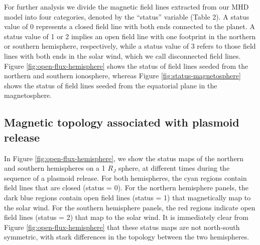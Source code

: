 For further analysis we divide the magnetic field lines extracted from our MHD model into four categories, denoted by the “status” variable (Table 2). A status value of 0 represents a closed field line with both ends connected to the planet. A status value of 1 or 2 implies an open field line with one footprint in the northern or southern hemisphere, respectively, while a status value of 3 refers to those field lines with both ends in the solar wind, which we call disconnected field lines. Figure \ref{fig:open-flux-hemisphere} shows the status of field lines seeded from the northern and southern ionosphere, whereas Figure \ref{fig:status-magnetosphere} shows the status of field lines seeded from the equatorial plane in the magnetosphere. 

\subsection{Magnetic topology associated with plasmoid release}

In Figure \ref{fig:open-flux-hemisphere}, we show the status maps of the northern and southern hemispheres on a 1 $R_J$ sphere, at different times during the sequence of a plasmoid release. For both hemispheres, the cyan regions contain field lines that are closed (status = 0). For the northern hemisphere panels, the dark blue regions contain open field lines (status = 1) that magnetically map to the solar wind. For the southern hemisphere panels, the red regions indicate open field lines (status = 2) that map to the solar wind. It is immediately clear from Figure \ref{fig:open-flux-hemisphere} that these status maps are not north‐south symmetric, with stark differences in the topology between the two hemispheres. 

